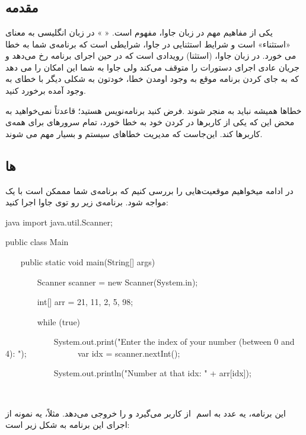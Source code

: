 \chapter{\DocTitle}
\section{مقدمه}

یکی از مفاهیم مهم در زبان جاوا، مفهوم  است. «
 » در زبان انگلیسی به معنای «استثناء» است و شرایط استثنایی
در جاوا، شرایطی است که برنامه‌ی شما به خطا می خورد. در زبان جاوا،
 (استثنا) رویدادی است که در حین اجرای برنامه
 رخ می‌دهد و جریان عادی اجرای دستورات را متوقف می‌کند ولی
جاوا به شما این امکان را می‌ دهد که به جای  کردن برنامه موقع به
وجود اومدن خطا، خودتون به شکلی دیگر با خطای به وجود آمده برخورد کنید.

خطاها همیشه نباید به  منجر شوند .فرض کنید برنامه‌نویس
 هستید؛ قاعدتاً نمی‌خواهید به محض این که یکی از کاربرها در
 کردن  خود به خطا خورد، تمام سرورهای 
برای همه‌ی کاربرها  کند. این‌جاست که مدیریت خطاهای سیستم و
 بسیار مهم می شوند.

\section{ ها}

در ادامه میخواهیم موقعیت‌هایی را بررسی کنیم که برنامه‌ی شما مممکن است با
یک  مواجه شود. برنامه‌ی زیر رو توی جاوا اجرا کنید:

\begin{codebox}{java}
import java.util.Scanner;

public class Main {
    public static void main(String[] args) {  
        Scanner scanner = new Scanner(System.in);

        int[] arr = {21, 11, 2, 5, 98};

        while (true) {  
            System.out.print("Enter the index of your number (between 0 and 4): ");
            var idx = scanner.nextInt();  
  
            System.out.println("Number at that idx: " + arr[idx]);  
        }  
    }  
}
\end{codebox}

این برنامه، یه عدد به اسم ‍ از کاربر می‌گیرد و  را
خروجی می‌دهد. مثلاً، یه نمونه از اجرای این برنامه به شکل زیر است:

